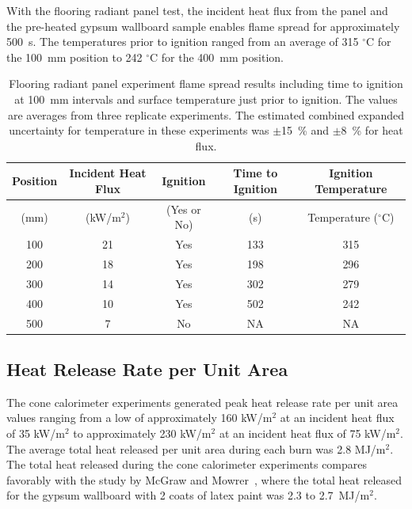 \documentclass[twoside]{uocthesis}
\begin{document}
{ With the flooring radiant panel test, the incident heat flux from the panel and the pre-heated gypsum wallboard sample enables flame spread for approximately 500~s.  The temperatures prior to ignition ranged from an average of 315 $^{\circ}$C for the 100~mm position to 242 $^{\circ}$C for the 400~mm position.      
 
      
\begin{table}
	\centering
	\small
	\begin{tabular}{|c|c|c|c|c|}
		\hline Position & Incident Heat Flux & Ignition & Time to Ignition & Ignition Temperature \\
		\hline (mm) & (kW/m$^2$) & (Yes or No) & (s)  & Temperature ($^{\circ}$C)   \\ 
		\hline 100 	& 21	& Yes 	& 133	& 315 	 \\
		\hline 200	& 18 	& Yes 	& 198 	& 296 	 \\
		\hline 300	& 14	& Yes 	& 302 	& 279 	 \\
		\hline 400	& 10	& Yes 	& 502 	& 242 	 \\
		\hline 500	&  7	& No 	& NA 	& NA   	 \\
		\hline
	\end{tabular}
	\caption[Flooring radiant panel experiment flame spread results]{Flooring radiant panel experiment flame spread results including time to ignition at 100~mm intervals and surface temperature just prior to ignition.  The values are averages from three replicate experiments.  The estimated combined expanded uncertainty for temperature in these experiments was $\pm$15~\% and $\pm$8~\% for heat flux.}
	\label{tab:FRP_timetemp}
\end{table}


\subsection{Heat Release Rate per Unit Area}

The cone calorimeter experiments generated peak heat release rate per unit area values ranging from a low of approximately 160 kW/m$^2$ at an incident heat flux of 35 kW/m$^2$ to approximately 230 kW/m$^2$ at an incident heat flux of 75 kW/m$^2$.  The average total heat released per unit area during each burn was 2.8 MJ/m$^2$.  The total heat released during the cone calorimeter experiments compares favorably with the study by McGraw and Mowrer~\cite{McGraw:1999}, where the total heat released for the gypsum wallboard with 2 coats of latex paint was 2.3 to 2.7~MJ/m$^2$.      

}
\end{document}
